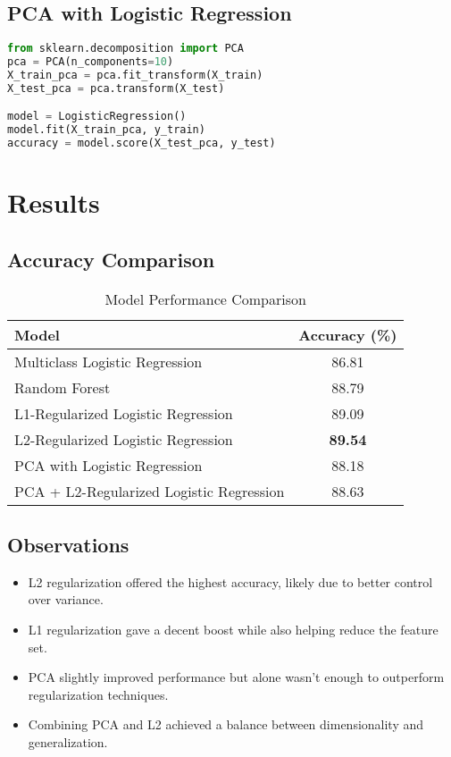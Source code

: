 \documentclass[a4paper,11pt]{article}
\begin{document}
\subsection*{PCA with Logistic Regression}
\begin{lstlisting}[language=Python]
from sklearn.decomposition import PCA
pca = PCA(n_components=10)
X_train_pca = pca.fit_transform(X_train)
X_test_pca = pca.transform(X_test)

model = LogisticRegression()
model.fit(X_train_pca, y_train)
accuracy = model.score(X_test_pca, y_test)
\end{lstlisting}

\section{Results}

\subsection*{Accuracy Comparison}

\begin{table}[H]
\centering
\caption{Model Performance Comparison}
\begin{tabular}{|l|c|}
\hline
\textbf{Model} & \textbf{Accuracy (\%)} \\
\hline
Multiclass Logistic Regression & 86.81 \\
Random Forest & 88.79 \\
L1-Regularized Logistic Regression & 89.09 \\
L2-Regularized Logistic Regression & \textbf{89.54} \\
PCA with Logistic Regression & 88.18 \\
PCA + L2-Regularized Logistic Regression & 88.63 \\
\hline
\end{tabular}
\end{table}

\subsection*{Observations}
\begin{itemize}
    \item L2 regularization offered the highest accuracy, likely due to better control over variance.
    \item L1 regularization gave a decent boost while also helping reduce the feature set.
    \item PCA slightly improved performance but alone wasn't enough to outperform regularization techniques.
    \item Combining PCA and L2 achieved a balance between dimensionality and generalization.
\end{itemize}
\end{document}

